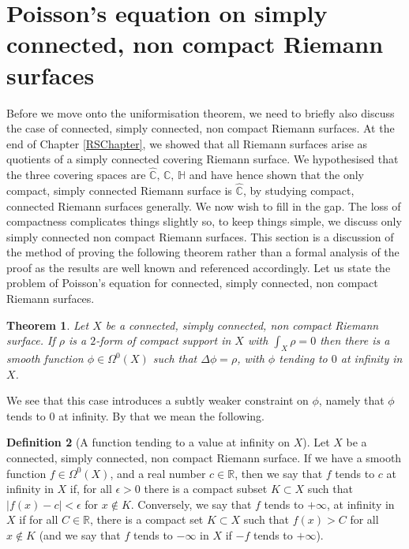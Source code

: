 \documentclass[11pt]{report}
\newtheorem{thm}{Theorem}[section]
\theoremstyle{definition}
\newtheorem{defn}[thm]{Definition}
\begin{document}
\section{Poisson's equation on simply connected, non compact Riemann surfaces}
Before we move onto the uniformisation theorem, we need to briefly also discuss the case of connected, simply connected, non compact Riemann surfaces. At the end of Chapter \ref{RSChapter}, we showed that all Riemann surfaces arise as quotients of a simply connected covering Riemann surface. We hypothesised that the three covering spaces are $\widehat{\mathbb{C}} ,\, \mathbb{C},\,\mathbb{H}$ and have hence shown that the only compact, simply connected Riemann surface is $\widehat{\mathbb{C}}$, by studying compact, connected Riemann surfaces generally. We now wish to fill in the gap. The loss of compactness complicates things slightly so, to keep things simple, we discuss only simply connected non compact Riemann surfaces.
This section is a discussion of the method of proving the following theorem rather than a formal analysis of the proof as the results are well known and referenced accordingly.
Let us state the problem of Poisson's equation for connected, simply connected, non compact Riemann surfaces.
\begin{thm}\label{NonCompactPoissons}
  Let $X$ be a connected, simply connected, non compact Riemann surface. If $\rho$ is a $2$-form of compact support in $X$ with $\int_X \rho = 0$ then there is a smooth function $\phi \in \Omega^0(X)$ such that $\Delta \phi = \rho$, with $\phi$ tending to $0$ at infinity in $X$.
\end{thm}
We see that this case introduces a subtly weaker constraint on $\phi$, namely that $\phi$ tends to $0$ at infinity. By that we mean the following.
\begin{defn}[A function tending to a value at infinity on $X$]
  Let $X$ be a connected, simply connected, non compact Riemann surface. If we have a smooth function $f \in \Omega^0(X)$, and a real number $c \in \mathbb{R}$, then we say that $f$ tends to $c$ at infinity in $X$ if, for all $\epsilon > 0$ there is a compact subset $K \subset X$ such that $|f(x) - c| < \epsilon$ for $x \notin K$.
  Conversely, we say that $f$ tends to $+\infty$, at infinity in $X$ if for all $C \in \mathbb{R}$, there is a compact set $K \subset X$ such that $f(x) > C$ for all $x \notin K$ (and we say that $f$ tends to $-\infty$ in $X$ if $-f$ tends to $+\infty$).
\end{defn}
\end{document}
